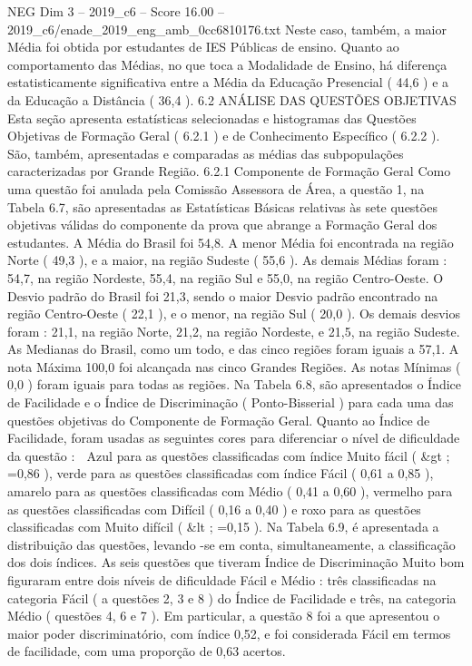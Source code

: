 \begin{textsample}{NEG Dim 3 – 2019\_c6 – Score 16.00 – 2019\_c6/enade\_2019\_eng\_amb\_0cc6810176.txt}
Neste caso, também, a maior Média foi obtida por estudantes de IES Públicas de ensino.
Quanto ao comportamento das Médias, no que toca a Modalidade de Ensino, há diferença estatisticamente significativa entre a Média da Educação Presencial ( 44,6 ) e a da Educação a Distância ( 36,4 ). 6.2 ANÁLISE DAS QUESTÕES OBJETIVAS Esta seção apresenta estatísticas selecionadas e histogramas das Questões Objetivas de Formação Geral ( 6.2.1 ) e de Conhecimento Específico ( 6.2.2 ).
São, também, apresentadas e comparadas as médias das subpopulações caracterizadas por Grande Região. 6.2.1 Componente de Formação Geral Como uma questão foi anulada pela Comissão Assessora de Área, a questão 1, na Tabela 6.7, são apresentadas as Estatísticas Básicas relativas às sete questões objetivas válidas do componente da prova que abrange a Formação Geral dos estudantes.
A Média do Brasil foi 54,8.
A menor Média foi encontrada na região Norte ( 49,3 ), e a maior, na região Sudeste ( 55,6 ).
As demais Médias foram : 54,7, na região Nordeste, 55,4, na região Sul e 55,0, na região Centro-Oeste.
O Desvio padrão do Brasil foi 21,3, sendo o maior Desvio padrão encontrado na região Centro-Oeste ( 22,1 ), e o menor, na região Sul ( 20,0 ).
Os demais desvios foram : 21,1, na região Norte, 21,2, na região Nordeste, e 21,5, na região Sudeste.
As Medianas do Brasil, como um todo, e das cinco regiões foram iguais a 57,1.
A nota Máxima 100,0 foi alcançada nas cinco Grandes Regiões.
As notas Mínimas ( 0,0 ) foram iguais para todas as regiões.
Na Tabela 6.8, são apresentados o Índice de Facilidade e o Índice de Discriminação ( Ponto-Bisserial ) para cada uma das questões objetivas do Componente de Formação Geral.
Quanto ao Índice de Facilidade, foram usadas as seguintes cores para diferenciar o nível de dificuldade da questão :  Azul para as questões classificadas com índice Muito fácil ( \&gt ; =0,86 ), verde para as questões classificadas com índice Fácil ( 0,61 a 0,85 ), amarelo para as questões classificadas com Médio ( 0,41 a 0,60 ), vermelho para as questões classificadas com Difícil ( 0,16 a 0,40 ) e roxo para as questões classificadas com Muito difícil ( \&lt ; =0,15 ).
Na Tabela 6.9, é apresentada a distribuição das questões, levando -se em conta, simultaneamente, a classificação dos dois índices.
As seis questões que tiveram Índice de Discriminação Muito bom figuraram entre dois níveis de dificuldade Fácil e Médio : três classificadas na categoria Fácil ( a questões 2, 3 e 8 ) do Índice de Facilidade e três, na categoria Médio ( questões 4, 6 e 7 ).
Em particular, a questão 8 foi a que apresentou o maior poder discriminatório, com índice 0,52, e foi considerada Fácil em termos de facilidade, com uma proporção de 0,63 acertos.

\end{textsample}
